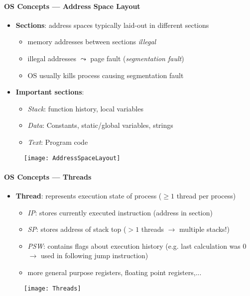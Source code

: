 \paragraph{OS Concepts --- Address Space Layout}
\begin{itemize}
	\item \textbf{Sections}: address spaces typically laid-out in different sections
	\begin{itemize}
		\item memory addresses between sections \emph{illegal}
		\item illegal addresses $ \leadsto $ page fault (\emph{segmentation fault})
		\item OS usually kills process causing segmentation fault
	\end{itemize}
	\item \textbf{Important sections}:
	\begin{itemize}
		\item \emph{Stack}: function history, local variables
		\item \emph{Data}: Constants, static/global variables, strings
		\item \emph{Text}: Program code
	\end{itemize}
\end{itemize}
\begin{figure}[h]\centering\label{AddressSpaceLayout}\texttt{[image: AddressSpaceLayout]}\end{figure}

\paragraph{OS Concepts --- Threads}
\begin{itemize}
	\item \textbf{Thread}: represents execution state of process ($ \geq 1 $ thread per process)
	\begin{itemize}
		\item \emph{IP}: stores currently executed instruction (address in  section)
		\item \emph{SP}: stores address of stack top ($ > 1 $ threads $ \to $ multiple stacks!)
		\item \emph{PSW}: contains flags about execution history (e.g. last calculation was 0 $ \to $ used in following jump instruction)
		\item more general purpose registers, floating point registers,...
	\end{itemize}
\end{itemize}
\begin{figure}[h]\centering\label{Threads}\texttt{[image: Threads]}\end{figure}

